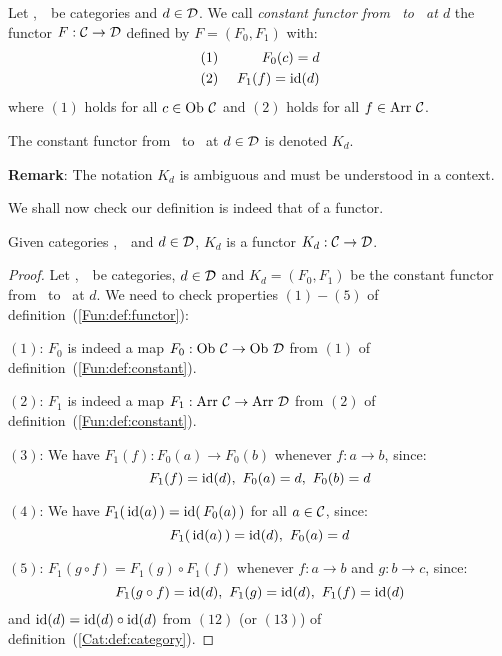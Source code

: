 \begin{defin}\label{Fun:def:constant}
    Let \Cat,\ \Dat\ be categories and $d\in\mbox{$\cal D$}$. We call {\em constant functor 
    from \Cat\ to \Dat\ at $d$} the functor $F:\mbox{$\cal C$}\to\mbox{$\cal D$}$ defined by 
    $F=(F_{0},F_{1})$ with:
        \begin{eqnarray*}
            (1)&\ &F_{0}(c) = d\\
            (2)&\ &F_{1}(f) = \mbox{\rm id}(d)
        \end{eqnarray*}
    where $(1)$ holds for all $c\in\mbox{\rm Ob}\ \mbox{$\cal C$}$ and $(2)$ holds for all
    $f\in\mbox{\rm Arr}\ \mbox{$\cal C$}$.
\end{defin}

\begin{notation}\label{Fun:notation:constant}
    The constant functor from \Cat\ to \Dat\ at $d\in\mbox{$\cal D$}$ is denoted $K_{d}$.
\end{notation}

\noindent
{\bf Remark}: The notation $K_{d}$ is ambiguous and must be understood in a context.

\noindent
We shall now check our definition is indeed that of a functor.

\begin{prop}\label{Fun:prop:constant}
    Given categories \Cat,\ \Dat\ and $d\in\mbox{$\cal D$}$, $K_{d}$ is a functor $K_{d}:
    \mbox{$\cal C$}\to\mbox{$\cal D$}$.
\end{prop}
\begin{proof}
    Let \Cat,\ \Dat\ be categories, $d\in\mbox{$\cal D$}$ and $K_{d}=(F_{0},F_{1})$ be the 
    constant functor from \Cat\ to \Dat\ at $d$. We need to check properties 
    $(1)-(5)$ of definition~(\ref{Fun:def:functor}):

    $(1)$: $F_{0}$ is indeed a map $F_{0}:\ob\ \Cat \to\ob\ \Dat$ from $(1)$ 
    of definition~(\ref{Fun:def:constant}).

    $(2)$: $F_{1}$ is indeed a map $F_{1}:\arr\ \Cat\to\arr\ \Dat$ from $(2)$ 
    of definition~(\ref{Fun:def:constant}).

    $(3)$: We have $F_{1}(f):F_{0}(a)\to F_{0}(b)$ whenever $f:a\to b$, since:
        \[
            F_{1}(f)=\id(d),\  F_{0}(a)=d,\ F_{0}(b)=d
        \]

    $(4)$: We have $F_{1}(\,\mbox{\rm id}(a)\,)=\mbox{\rm id}(\,F_{0}(a)\,)$ for
    all $a\in\mbox{$\cal C$}$, since:
        \[
            F_{1}(\,\id(a)\,)=\id(d),\ F_{0}(a)=d
        \]

    $(5)$: $F_{1}(g\circ f)=F_{1}(g)\circ F_{1}(f)$ whenever $f:a\to b$ 
    and $g:b\to c$, since:
        \[
            F_{1}(g\circ f) = \id(d),\ F_{1}(g)=\id(d),\  F_{1}(f)=\id(d)
        \]
    and $\mbox{\rm id}(d)=\mbox{\rm id}(d)\circ\mbox{\rm id}(d)$ from $(12)$ (or $(13)$) of
    definition~(\ref{Cat:def:category}).
\end{proof}
